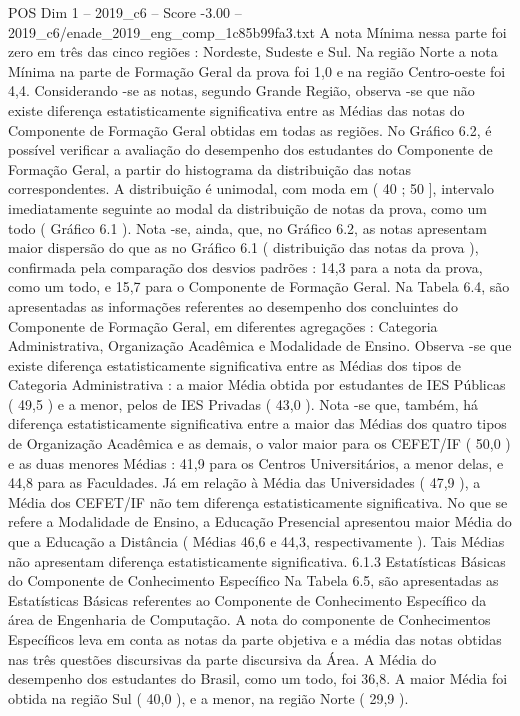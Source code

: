 \begin{textsample}{POS Dim 1 – 2019\_c6 – Score -3.00 – 2019\_c6/enade\_2019\_eng\_comp\_1c85b99fa3.txt}
A nota Mínima nessa parte foi zero em três das cinco regiões : Nordeste, Sudeste e Sul.
Na região Norte a nota Mínima na parte de Formação Geral da prova foi 1,0 e na região Centro-oeste foi 4,4.
Considerando -se as notas, segundo Grande Região, observa -se que não existe diferença estatisticamente significativa entre as Médias das notas do Componente de Formação Geral obtidas em todas as regiões.
No Gráfico 6.2, é possível verificar a avaliação do desempenho dos estudantes do Componente de Formação Geral, a partir do histograma da distribuição das notas correspondentes.
A distribuição é unimodal, com moda em ( 40 ; 50 ], intervalo imediatamente seguinte ao modal da distribuição de notas da prova, como um todo ( Gráfico 6.1 ).
Nota -se, ainda, que, no Gráfico 6.2, as notas apresentam maior dispersão do que as no Gráfico 6.1 ( distribuição das notas da prova ), confirmada pela comparação dos desvios padrões : 14,3 para a nota da prova, como um todo, e 15,7 para o Componente de Formação Geral.
Na Tabela 6.4, são apresentadas as informações referentes ao desempenho dos concluintes do Componente de Formação Geral, em diferentes agregações : Categoria Administrativa, Organização Acadêmica e Modalidade de Ensino.
Observa -se que existe diferença estatisticamente significativa entre as Médias dos tipos de Categoria Administrativa : a maior Média obtida por estudantes de IES Públicas ( 49,5 ) e a menor, pelos de IES Privadas ( 43,0 ).
Nota -se que, também, há diferença estatisticamente significativa entre a maior das Médias dos quatro tipos de Organização Acadêmica e as demais, o valor maior para os CEFET/IF ( 50,0 ) e as duas menores Médias : 41,9 para os Centros Universitários, a menor delas, e 44,8 para as Faculdades.
Já em relação à Média das Universidades ( 47,9 ), a Média dos CEFET/IF não tem diferença estatisticamente significativa.
No que se refere a Modalidade de Ensino, a Educação Presencial apresentou maior Média do que a Educação a Distância ( Médias 46,6 e 44,3, respectivamente ).
Tais Médias não apresentam diferença estatisticamente significativa. 6.1.3 Estatísticas Básicas do Componente de Conhecimento Específico Na Tabela 6.5, são apresentadas as Estatísticas Básicas referentes ao Componente de Conhecimento Específico da área de Engenharia de Computação.
A nota do componente de Conhecimentos Específicos leva em conta as notas da parte objetiva e a média das notas obtidas nas três questões discursivas da parte discursiva da Área.
A Média do desempenho dos estudantes do Brasil, como um todo, foi 36,8.
A maior Média foi obtida na região Sul ( 40,0 ), e a menor, na região Norte ( 29,9 ).

\end{textsample}

